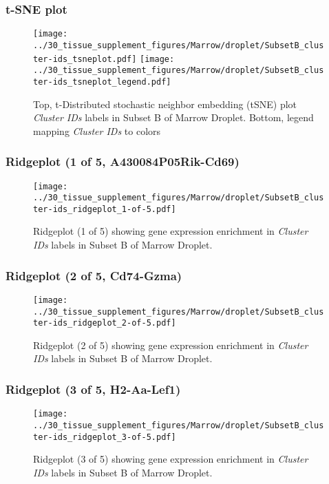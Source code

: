 \clearpage
\subsubsection{t-SNE plot}
\begin{figure}[h]
\centering
\texttt{[image: ../30\_tissue\_supplement\_figures/Marrow/droplet/SubsetB\_cluster-ids\_tsneplot.pdf]}
\texttt{[image: ../30\_tissue\_supplement\_figures/Marrow/droplet/SubsetB\_cluster-ids\_tsneplot\_legend.pdf]}
\caption{Top, t-Distributed stochastic neighbor embedding (tSNE) plot  \emph{Cluster IDs} labels in Subset B of Marrow Droplet. Bottom, legend mapping \emph{Cluster IDs} to colors}
\end{figure}


\clearpage

\subsubsection{Ridgeplot (1 of 5, A430084P05Rik-Cd69)}
\begin{figure}[h]
\centering
\texttt{[image: ../30\_tissue\_supplement\_figures/Marrow/droplet/SubsetB\_cluster-ids\_ridgeplot\_1-of-5.pdf]}

\caption{ Ridgeplot (1 of 5)  showing gene expression enrichment in \emph{Cluster IDs} labels in Subset B of Marrow Droplet. }
\end{figure}


\clearpage

\subsubsection{Ridgeplot (2 of 5, Cd74-Gzma)}
\begin{figure}[h]
\centering
\texttt{[image: ../30\_tissue\_supplement\_figures/Marrow/droplet/SubsetB\_cluster-ids\_ridgeplot\_2-of-5.pdf]}

\caption{ Ridgeplot (2 of 5)  showing gene expression enrichment in \emph{Cluster IDs} labels in Subset B of Marrow Droplet. }
\end{figure}


\clearpage

\subsubsection{Ridgeplot (3 of 5, H2-Aa-Lef1)}
\begin{figure}[h]
\centering
\texttt{[image: ../30\_tissue\_supplement\_figures/Marrow/droplet/SubsetB\_cluster-ids\_ridgeplot\_3-of-5.pdf]}

\caption{ Ridgeplot (3 of 5)  showing gene expression enrichment in \emph{Cluster IDs} labels in Subset B of Marrow Droplet. }
\end{figure}



